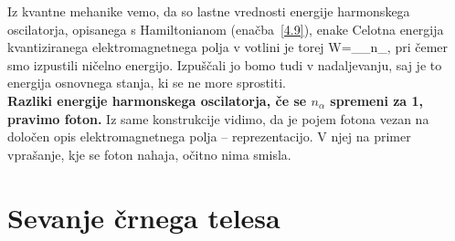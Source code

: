 \noindent
Iz kvantne mehanike vemo, da so lastne vrednosti energije harmonskega oscilatorja, 
opisanega s Hamiltonianom (enačba~\ref{4.9}), enake
Celotna energija kvantiziranega elektromagnetnega polja v votlini
je torej 
\beq
W=\sum_{\alpha}\hbar\omega_{\alpha}n_{\alpha},
\eeq
pri čemer smo izpustili ničelno energijo. Izpuščali jo bomo tudi v nadaljevanju, saj
je to energija osnovnega stanja, ki se ne more sprostiti. \\

\noindent
{\bf Razliki energije harmonskega oscilatorja, če se $n_{\alpha}$
spremeni za 1, pravimo foton.} Iz same konstrukcije vidimo,
da je pojem fotona vezan na določen opis elektromagnetnega polja --
reprezentacijo. V njej na primer vprašanje, kje se foton nahaja, očitno
nima smisla.


\section{Sevanje črnega telesa}

